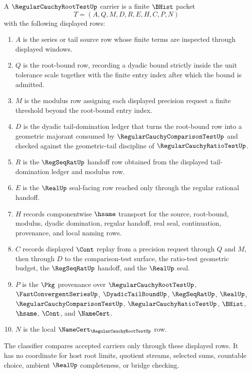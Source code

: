 \begin{definition}
\label{def:regular-cauchy-root-test-carrier}
A $\RegularCauchyRootTestUp$ carrier is a finite $\BHist$ packet
$$
T=(A,Q,M,D,R,E,H,C,P,N)
$$
with the following displayed rows:
\begin{enumerate}
\item $A$ is the series or tail source row whose finite terms are inspected through displayed windows.
\item $Q$ is the root-bound row, recording a dyadic bound strictly inside the unit tolerance scale together with the finite entry index after which the bound is admitted.
\item $M$ is the modulus row assigning each displayed precision request a finite threshold beyond the root-bound entry index.
\item $D$ is the dyadic tail-domination ledger that turns the root-bound row into a geometric majorant consumed by $\RegularCauchyComparisonTestUp$ and checked against the geometric-tail discipline of $\RegularCauchyRatioTestUp$.
\item $R$ is the $\RegSeqRatUp$ handoff row obtained from the displayed tail-domination ledger and modulus row.
\item $E$ is the $\RealUp$ seal-facing row reached only through the regular rational handoff.
\item $H$ records componentwise $\hsame$ transport for the source, root-bound, modulus, dyadic domination, regular handoff, real seal, continuation, provenance, and local naming rows.
\item $C$ records displayed $\Cont$ replay from a precision request through $Q$ and $M$, then through $D$ to the comparison-test surface, the ratio-test geometric budget, the $\RegSeqRatUp$ handoff, and the $\RealUp$ seal.
\item $P$ is the $\Pkg$ provenance over $\RegularCauchyRootTestUp$, $\FastConvergentSeriesUp$, $\DyadicTailBoundUp$, $\RegSeqRatUp$, $\RealUp$, $\RegularCauchyComparisonTestUp$, $\RegularCauchyRatioTestUp$, $\BHist$, $\hsame$, $\Cont$, and $\NameCert$.
\item $N$ is the local $\NameCert_{\RegularCauchyRootTestUp}$ row.
\end{enumerate}
The classifier compares accepted carriers only through these displayed rows. It has no coordinate for host root limits, quotient streams, selected sums, countable choice, ambient $\RealUp$ completeness, or bridge checking.
\end{definition}

